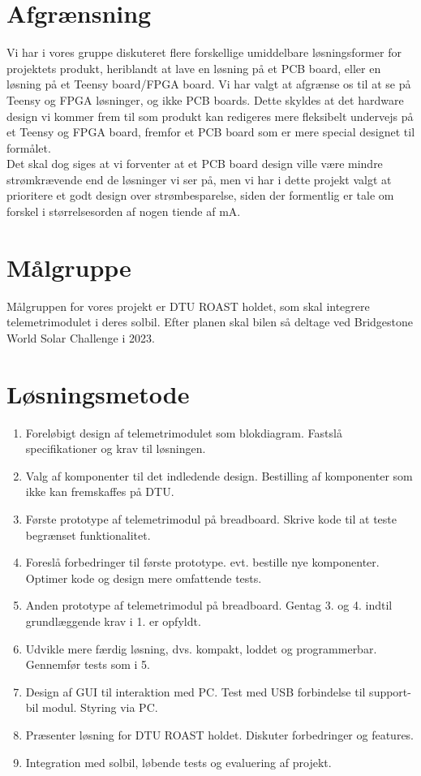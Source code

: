 \documentclass[]{article}
\begin{document}
\section{Afgrænsning}
Vi har i vores gruppe diskuteret flere forskellige umiddelbare løsningsformer for projektets produkt, heriblandt at lave en løsning på et PCB board, eller en løsning på et Teensy board/FPGA board. Vi har valgt at afgrænse os til at se på Teensy og FPGA løsninger, og ikke PCB boards. Dette skyldes at det hardware design vi kommer frem til som produkt kan redigeres mere fleksibelt undervejs på et Teensy og FPGA board, fremfor et PCB board som er mere special designet til formålet.\\
Det skal dog siges at vi forventer at et PCB board design ville være mindre strømkrævende end de løsninger vi ser på, men vi har i dette projekt valgt at prioritere et godt design over strømbesparelse, siden der formentlig er tale om forskel i størrelsesorden af nogen tiende af mA.
\section{Målgruppe}
Målgruppen for vores projekt er DTU ROAST holdet, som skal integrere telemetrimodulet i deres solbil. Efter planen skal bilen så deltage ved Bridgestone World Solar Challenge i 2023.
\section{Løsningsmetode}
\begin{enumerate}
    \item Foreløbigt design af telemetrimodulet som blokdiagram. Fastslå specifikationer og krav til løsningen. 
    \item Valg af komponenter til det indledende design. Bestilling af komponenter som ikke kan fremskaffes på DTU. 
    \item Første prototype af telemetrimodul på breadboard. Skrive kode til at teste begrænset funktionalitet. 
    \item Foreslå forbedringer til første prototype. evt. bestille nye komponenter. Optimer kode og design mere omfattende tests.
    \item Anden prototype af telemetrimodul på breadboard. Gentag 3. og 4. indtil grundlæggende krav i 1. er opfyldt. 
    \item Udvikle mere færdig løsning, dvs. kompakt, loddet og programmerbar. Gennemfør tests som i 5. 
    \item Design af GUI til interaktion med PC. Test med USB forbindelse til support-bil modul. Styring via PC.  
    \item Præsenter løsning for DTU ROAST holdet. Diskuter forbedringer og features. 
    \item Integration med solbil, løbende tests og evaluering af projekt. 
\end{enumerate}
\end{document}

